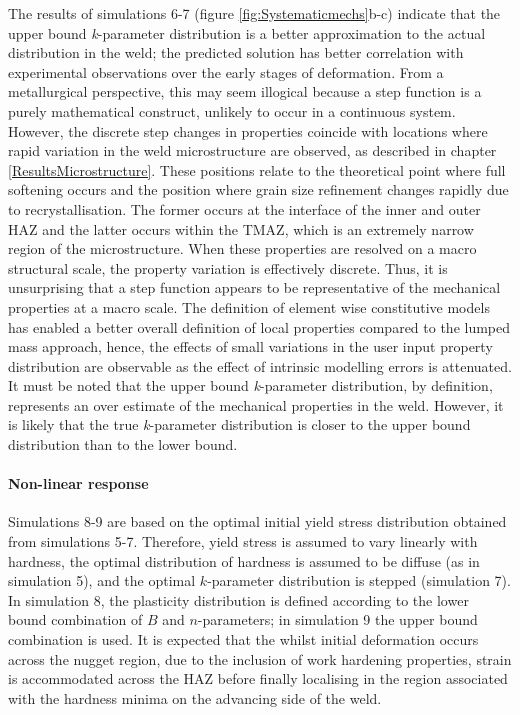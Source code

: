 The results of simulations 6-7 (figure \ref{fig:Systematicmechs}b-c) indicate that the upper bound \textit{k}-parameter distribution is a better approximation to the actual distribution in the weld; the predicted solution has better correlation with experimental observations over the early stages of deformation. From a metallurgical perspective, this may seem illogical because a step function is a purely mathematical construct, unlikely to occur in a continuous system. However, the discrete step changes in properties coincide with locations where rapid variation in the weld microstructure are observed, as described in chapter \ref{ResultsMicrostructure}. These positions relate to the theoretical point where full softening occurs and the position where grain size refinement changes rapidly due to recrystallisation. The former occurs at the interface of the inner and outer HAZ and the latter occurs within the TMAZ, which is an extremely narrow region of the microstructure. When these properties are resolved on a macro structural scale, the property variation is effectively discrete. Thus, it is unsurprising that a step function appears to be representative of the mechanical properties at a macro scale. The definition of element wise constitutive models has enabled a better overall definition of local properties compared to the lumped mass approach, hence, the effects of small variations in the user input property distribution are observable as the effect of intrinsic modelling errors is attenuated. It must be noted that the upper bound \textit{k}-parameter distribution, by definition, represents an over estimate of the mechanical properties in the weld. However, it is likely that the true \textit{k}-parameter distribution is closer to the upper bound distribution than to the lower bound. 

\paragraph{Non-linear response}
\label{SMDModellingstudyDiscussionPropertydistributionsPS}
Simulations 8-9 are based on the optimal initial yield stress distribution obtained from simulations 5-7. Therefore, yield stress is assumed to vary linearly with hardness, the optimal distribution of hardness is assumed to be diffuse (as in simulation 5), and the optimal $k$-parameter distribution is stepped (simulation 7). In simulation 8, the plasticity distribution is defined according to the lower bound combination of $B$ and $n$-parameters; in simulation 9 the upper bound combination is used. It is expected that the whilst initial deformation occurs across the nugget region, due to the inclusion of work hardening properties, strain is accommodated across the HAZ before finally localising in the region associated with the hardness minima on the advancing side of the weld.

